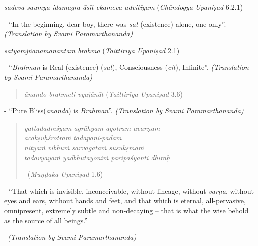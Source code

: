 \textit{sadeva saumya idamagra āsīt ekameva advitīyam } (\textit{Chāndogya Upaniṣad} 6.2.1)

\begin{myquote}
- ``In the beginning, dear boy, there was \textit{sat} (existence) alone, one only”. \textit{(Translation by Svami Paramarthananda)}
\end{myquote}

\textit{satyamjñānamanantam brahma } (\textit{Taittirīya Upaniṣad} 2.1)

\begin{myquote}
- ``\textit{Brahman} is Real (existence) (\textit{sat}), Consciousness (\textit{cit}), Infinite''. \textit{(Translation by Svami Paramarthananda)}
\end{myquote}

\begin{verse}
\textit{ānando brahmeti vyajānāt } (\textit{Taittirīya Upaniṣad} 3.6)
\end{verse}

\begin{myquote}
- ``Pure Bliss(\textit{ānanda}) is \textit{Brahman}”. \textit{(Translation by Svami Paramarthananda)}
\end{myquote}

\begin{verse}
\textit{yattadadreśyam agrāhyam agotram avarṇam}\\ \textit{acakṣuḥśrotraṁ tadapāṇi-pādam }\\ \textit{nityaṁ vibhuṁ sarvagataṁ susūkṣmaṁ}\\ \textit{tadavyayaṁ yadbhūtayoniṁ paripaśyanti dhīrāḥ } 

~\hfill (\textit{Muṇḍaka Upaniṣad} 1.6)
\end{verse}

\begin{myquote}
- ``That which is invisible, inconceivable, without lineage, without \textit{varṇa}, without eyes and ears, without hands and feet, and that which is eternal, all-pervasive, omnipresent, extremely subtle and non-decaying – that is what the wise behold as the source of all beings.” 

~\hfill \textit{(Translation by Svami Paramarthananda)}
\end{myquote}

